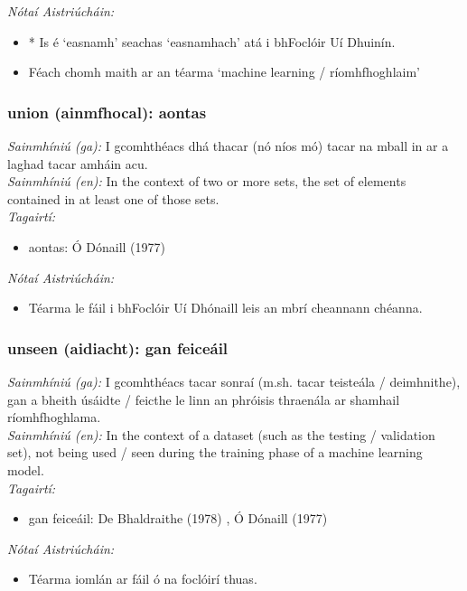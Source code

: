  \noindent \textit{Nótaí Aistriúcháin:}
\begin{itemize}
	\item * Is é `easnamh' seachas `easnamhach' atá i bhFoclóir Uí Dhuinín.
	\item Féach chomh maith ar an téarma `machine learning / ríomhfhoghlaim'
\end{itemize}


\subsubsection*{union (ainmfhocal): aontas}
 \noindent \textit{Sainmhíniú (ga):} I gcomhthéacs dhá thacar (nó níos mó) tacar na mball in ar a laghad tacar amháin acu.
\\
 \noindent \textit{Sainmhíniú (en):} In the context of two or more sets, the set of elements contained in at least one of those sets.
\\
 \noindent \textit{Tagairtí:}
\begin{itemize}
	\item aontas: Ó Dónaill (1977) \cite{odonaill}
\end{itemize}

 \noindent \textit{Nótaí Aistriúcháin:}
\begin{itemize}
	\item Téarma le fáil i bhFoclóir Uí Dhónaill leis an mbrí cheannann chéanna.
\end{itemize}


\subsubsection*{unseen (aidiacht): gan feiceáil}
 \noindent \textit{Sainmhíniú (ga):} I gcomhthéacs tacar sonraí (m.sh. tacar teisteála / deimhnithe), gan a bheith úsáidte / feicthe le linn an phróisis thraenála ar shamhail ríomhfhoghlama.
\\
 \noindent \textit{Sainmhíniú (en):} In the context of a dataset (such as the testing / validation set), not being used / seen during the training phase of a machine learning model.
\\
 \noindent \textit{Tagairtí:}
\begin{itemize}
	\item gan feiceáil: De Bhaldraithe (1978) \cite{de-bhaldraithe}, Ó Dónaill (1977) \cite{odonaill}
\end{itemize}

 \noindent \textit{Nótaí Aistriúcháin:}
\begin{itemize}
	\item Téarma iomlán ar fáil ó na foclóirí thuas.
\end{itemize}


